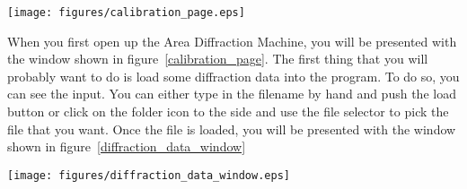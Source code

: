 
\begin{SCfigure}[1][htb]
    \centering
    \texttt{[image: figures/calibration\_page.eps]}
    \caption{A screen shot of the calibration tab to the program.
    This is what you see when you first open up the program. 
    This page allows you to, among other things, load diffraction
    data into the program.} 
    \label{calibration_page}
\end{SCfigure}



When you first open up the Area Diffraction Machine, you
will be presented with the window shown in 
figure~\ref{calibration_page}. The first thing that you
will probably want to do is load some diffraction data into
the program. To do so, you can see the  input.
You can either type in the filename by hand and push the
load button or click on the folder icon to the side and
use the file selector to pick the file that you want.
Once the file is loaded, you will be presented with
the window shown in figure~\ref{diffraction_data_window}

\begin{SCfigure}[1][htb]
    \centering
    \texttt{[image: figures/diffraction\_data\_window.eps]}
    \caption{A screen shot of the diffraction data window for
    the program. This window will be opened up after a file is 
    loaded. This windows allows you to interact with diffraction 
    data.} 
    \label{diffraction_data_window}
\end{SCfigure}


